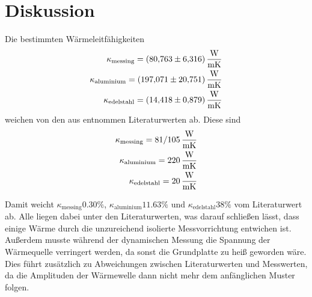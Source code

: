 \section{Diskussion}
\label{sec:Diskussion}

Die bestimmten Wärmeleitfähigkeiten 
\begin{align*}
\kappa _\text{messing} = \SI{80.763(6316)}{\frac{\watt}{\meter\kelvin}}     \\
\kappa _\text{aluminium} = \SI{197.071(20751)}{\frac{\watt}{\meter\kelvin}}\\
\kappa _\text{edelstahl} = \SI{14.418(879)}{\frac{\watt}{\meter\kelvin}}\\
\end{align*}
\FloatBarrier
weichen von den aus \cite{leitfaehigkeit} entnommen Literaturwerten ab.
Diese sind 
\begin{align*}
\kappa _\text{messing} = 81 \-/ \SI{105}{\frac{\watt}{\meter\kelvin}}\\
\kappa _\text{aluminium} = \SI{220}{\frac{\watt}{\meter\kelvin}}\\
\kappa _\text{edelstahl} = \SI{20}{\frac{\watt}{\meter\kelvin}}\\
\end{align*}

Damit weicht $\kappa _\text{messing} 0.30 \%$, $\kappa _\text{aluminium} 11.63 \%$ und $\kappa _\text{edelstahl} 38\%$ vom Literaturwert ab.
Alle liegen dabei unter den Literaturwerten, was darauf schließen lässt, dass einige Wärme durch die unzureichend isolierte Messvorrichtung entwichen ist.
Außerdem musste während der dynamischen Messung die Spannung der Wärmequelle verringert werden, da sonst die Grundplatte zu heiß geworden wäre.
Dies führt zusätzlich zu Abweichungen zwischen Literaturwerten und Messwerten, da die Amplituden der Wärmewelle dann nicht mehr dem anfänglichen Muster folgen.
